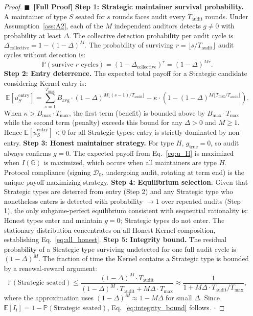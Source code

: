 \documentclass[12pt,a4paper]{article}
\theoremstyle{definition}
\newcommand{\rigorFull}[0]{$\blacksquare$~\textbf{[Full Proof]}}
\newcommand{\Community}{\mathbb{G}}
\newcommand{\E}{\mathbb{E}}
\newcommand{\Pbb}{\mathbb{P}}
\newcommand{\gzero}{g=0}
\newcommand{\gnonzero}{g \neq 0}
\newcommand{\GzeroDecl}{\mathcal{D}_{0}}
\begin{document}
\begin{proof}\rigorFull
\textbf{Step 1: Strategic maintainer survival probability.} A maintainer of type $S$ seated for $s$ rounds faces audit every $T_{\text{audit}}$ rounds. Under Assumption~\ref{ass:A2}, each of the $M$ independent auditors detects $\gnonzero$ with probability at least $\Delta$. The collective detection probability per audit cycle is $\Delta_{\text{collective}} = 1 - (1 - \Delta)^M$. The probability of surviving $r = \lfloor s / T_{\text{audit}} \rfloor$ audit cycles without detection is:
\begin{equation}
    \Pbb(\text{survive } r \text{ cycles}) = (1 - \Delta_{\text{collective}})^r = (1 - \Delta)^{M r}.
    \label{eq:survival}
\end{equation}
\textbf{Step 2: Entry deterrence.} The expected total payoff for a Strategic candidate considering Kernel entry is:
\begin{equation}
    \E[u_S^{\text{entry}}] = \sum_{s=1}^{T_{\max}} B_{\text{avg}} \cdot (1 - \Delta)^{M \lfloor (s-1)/T_{\text{audit}} \rfloor} - \kappa \cdot \left(1 - (1 - \Delta)^{M \lfloor T_{\max}/T_{\text{audit}} \rfloor}\right).
    \label{eq:entry_payoff}
\end{equation}
When $\kappa > B_{\max} \cdot T_{\max}$, the first term (benefit) is bounded above by $B_{\max} \cdot T_{\max}$ while the second term (penalty) exceeds this bound for any $\Delta > 0$ and $M \geq 1$. Hence $\E[u_S^{\text{entry}}] < 0$ for all Strategic types: entry is strictly dominated by non-entry.
\textbf{Step 3: Honest maintainer strategy.} For type $H$, $g_{\mathrm{true}} = 0$, so audit always confirms $\gzero$. The expected payoff from Eq.~\eqref{eq:u_H} is maximized when $I(\Community)$ is maximized, which occurs when all maintainers are type $H$. Protocol compliance (signing $\GzeroDecl$, undergoing audit, rotating at term end) is the unique payoff-maximizing strategy.
\textbf{Step 4: Equilibrium selection.} Given that Strategic types are deterred from entry (Step 2) and any Strategic type who nonetheless enters is detected with probability $\to 1$ over repeated audits (Step 1), the only subgame-perfect equilibrium consistent with sequential rationality is: Honest types enter and maintain $\gzero$; Strategic types do not enter. The stationary distribution concentrates on all-Honest Kernel composition, establishing Eq.~\eqref{eq:all_honest}.
\textbf{Step 5: Integrity bound.} The residual probability of a Strategic type surviving undetected for one full audit cycle is $(1 - \Delta)^M$. The fraction of time the Kernel contains a Strategic type is bounded by a renewal-reward argument:
\begin{equation}
    \Pbb(\text{Strategic seated}) \leq \frac{(1 - \Delta)^M \cdot T_{\text{audit}}}{(1 - \Delta)^M \cdot T_{\text{audit}} + M \Delta \cdot T_{\max}} \approx \frac{1}{1 + M \Delta \cdot T_{\text{audit}} / T_{\max}},
    \label{eq:renewal}
\end{equation}
where the approximation uses $(1 - \Delta)^M \approx 1 - M\Delta$ for small $\Delta$. Since $\E[I_t] = 1 - \Pbb(\text{Strategic seated})$, Eq.~\eqref{eq:integrity_bound} follows. $\square$
\end{proof}
\end{document}
